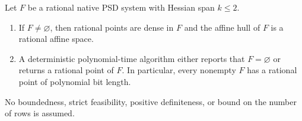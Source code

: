 \begin{theorem}
\label{thm:qc-span-two}
Let $F$ be a rational native PSD system with Hessian span $k\le2$.
\begin{enumerate}[label=(\alph*),leftmargin=*]
\item If $F\ne\varnothing$, then rational points are dense in $F$ and the
affine hull of $F$ is a rational affine space.
\item A deterministic polynomial-time algorithm either reports that
$F=\varnothing$ or returns a rational point of $F$. In particular, every
nonempty $F$ has a rational point of polynomial bit length.
\end{enumerate}
No boundedness, strict feasibility, positive definiteness, or bound on the
number of rows is assumed.
\end{theorem}

